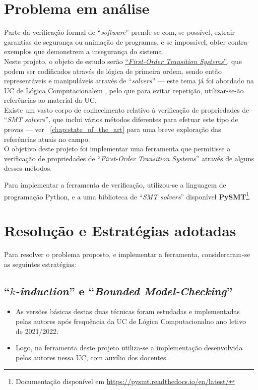 \documentclass[11pt,a4paper]{report}%
\def\bmc{``\textit{Bounded Model-Checking}''\xspace}
\def\fotss{``\textit{First-Order Transition Systems}''\xspace}
\def\pysmt{\textbf{PySMT}}
\def\pysmtlink{\footnote{Documentação disponível em \url{https://pysmt.readthedocs.io/en/latest/}}}
\def\lc{Lógica Computacional}
\def\kind{``\textit{$k$-induction}''\xspace}
\begin{document}
\section{Problema em análise}

Parte da verificação formal de ``\textit{software}'' prende-se com, se possível, extrair garantias
de segurança ou animação de programas, e se impossível, obter contra-exemplos que demonstrem
a insegurança do sistema.\\

Neste projeto, o objeto de estudo serão \href{https://paper.dropbox.com/doc/Capitulo-4-Sistemas-Hibridos-ycW40nf36f1eZW4f4k5e8#:uid=066724259771101962905059&h2=Descri\%C3\%A7\%C3\%A3o-do-aut\%C3\%B3mato-h\%C3\%ADbrido}{\fotss}, que podem ser codificados através de
lógica de primeira ordem, sendo então representáveis e manipuláveis
através de ``\textit{solvers}'' --- este tema já foi abordado na UC de \lc em
\cite{lc2122}, pelo que para evitar repetição, utilizar-se-ão referências ao material da UC.\\

Existe um vasto corpo de conhecimento relativo à verificação de propriedades de ``\textit{SMT solvers}'',
que inclui vários métodos diferentes para efetuar este tipo de provas --- ver ~\ref{chap:state_of_the_art}
para uma breve exploração das referências atuais no campo.\\

O objetivo deste projeto foi implementar uma ferramenta que permitisse a verificação de
propriedades de \fotss através de alguns desses métodos.

Para implementar a ferramenta de verificação, utilizou-se a linguagem de programação Python, e a
uma biblioteca de ``\textit{SMT solvers}'' disponível  \pysmt \pysmtlink.

\section{Resolução e Estratégias adotadas}

Para resolver o problema proposto, e implementar a ferramenta, consideraram-se as seguintes estratégias:

\subsection{\kind e \bmc}
\begin{itemize}
    \item As versões básicas destas duas técnicas foram estudadas e implementadas pelas autores
    após frequência da UC de \lc no ano letivo de 2021/2022.
    \item Logo, na ferramenta deste projeto utiliza-se a implementação desenvolvida pelos autores
    nessa UC, com auxílio dos docentes.
\end{itemize}
\end{document}
